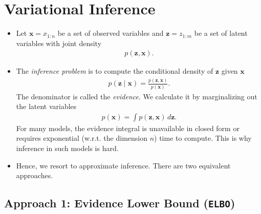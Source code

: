 \documentclass[10pt]{article}
\newcommand{\elbo}{\texttt{ELBO}}
\begin{document}
\newpage

\section{Variational Inference}

\begin{itemize}
\item Let $\bm{x} = x_{1:n}$ be a set of observed variables and $\bm{z} = z_{1:m}$ be a set of latent variables with joint density
\begin{align*}
p(\bm{z},\bm{x}).
\end{align*}
\item The \textit{inference problem} is to compute the conditional density of $\bm{z}$ given $\bm{x}$
\begin{align*}
p(\bm{z} \mid \bm{x}) = \frac{p(\bm{z},\bm{x})}{p(\bm{x})}.
\end{align*}
The denominator is called the \textit{evidence}. We calculate it by marginalizing out the latent variables
\begin{align*}
p(\bm{x}) = \int p(\bm{z},\bm{x}) \, d\bm{z}.
\end{align*}
For many models, the evidence integral is unavailable in closed form or requires exponential (w.r.t. the dimension $n$) time to compute. This is why inference in such models is hard.
\item Hence, we resort to approximate inference. There are two equivalent approaches.
\end{itemize}

\subsection{Approach 1: Evidence Lower Bound (\elbo)} \label{sec:elbo}
\end{document}

